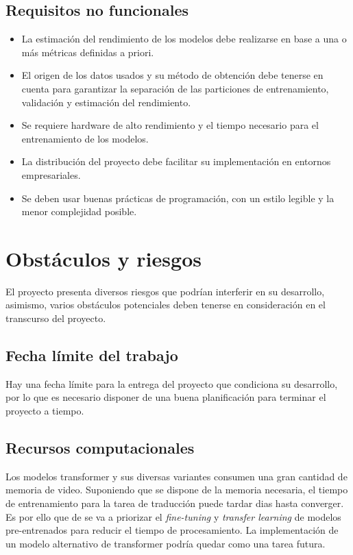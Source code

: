\subsection{Requisitos no funcionales}
\begin{itemize}
    \item La estimación del rendimiento de los modelos debe realizarse en base a una o más métricas definidas
    a priori.
    \item El origen de los datos usados y su método de obtención debe tenerse en cuenta
    para garantizar la separación de las particiones de entrenamiento, validación y estimación del rendimiento.
    \item Se requiere hardware de alto rendimiento y el tiempo necesario para el entrenamiento
    de los modelos.
    \item La distribución del proyecto debe facilitar su implementación en entornos empresariales.
    \item Se deben usar buenas prácticas de programación, con un estilo legible y la menor
        complejidad posible.
\end{itemize}

\section{Obstáculos y riesgos}
El proyecto presenta diversos riesgos que podrían interferir en su desarrollo, asimismo, varios obstáculos
potenciales deben tenerse en consideración en el transcurso del proyecto.
\subsection{Fecha límite del trabajo}
Hay una fecha límite para la entrega del proyecto que condiciona su desarrollo, por lo que
es necesario disponer de una buena planificación para terminar el proyecto a tiempo.
\subsection{Recursos computacionales}
Los modelos transformer y sus diversas variantes consumen una gran cantidad de memoria de video.
Suponiendo que se dispone de la memoria necesaria, el tiempo de entrenamiento para la tarea de traducción
puede tardar dias hasta converger. Es por ello que de se va a priorizar el \textit{fine-tuning} y
\textit{transfer learning} de modelos pre-entrenados para reducir el tiempo de procesamiento.
La implementación de un modelo alternativo de transformer podría quedar como una tarea futura.
